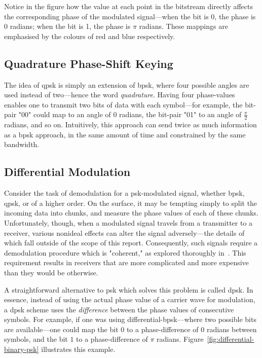 \documentclass[class=report,11pt,crop=false]{standalone}
\begin{document}
Notice in the figure how the value at each point in the bitstream directly affects the corresponding phase of the modulated signal---when the bit is 0, the phase is \(0\) radians; when the bit is 1, the phase is \(\pi\) radians. These mappings are emphasised by the colours of red and blue respectively.

\subsection{Quadrature Phase-Shift Keying}
The idea of \gls{qpsk} is simply an extension of \gls{bpsk}, where four possible angles are used instead of two---hence the word \emph{quadrature}. Having four phase-values enables one to transmit two bits of data with each symbol---for example, the bit-pair "00" could map to an angle of 0 radians, the bit-pair "01" to an angle of \(\frac{\pi}{2}\) radians, and so on. Intuitively, this approach can send twice as much information as a \gls{bpsk} approach, in the same amount of time and constrained by the same bandwidth.

\subsection{Differential Modulation}
Consider the task of demodulation for a \gls{psk}-modulated signal, whether \gls{bpsk}, \gls{qpsk}, or of a higher order. On the surface, it may be tempting simply to split the incoming data into chunks, and measure the phase values of each of these chunks. Unfortunately, though, when a modulated signal travels from a transmitter to a receiver, various nonideal effects can alter the signal adversely---the details of which fall outside of the scope of this report. Consequently, such signals require a demodulation procedure which is "coherent," as explored thoroughly in~\cite{Grami2016}. This requirement results in receivers that are more complicated and more expensive than they would be otherwise.

A straightforward alternative to \gls{psk} which solves this problem is called \gls{dpsk}. In essence, instead of using the actual phase value of a carrier wave for modulation, a \gls{dpsk} scheme uses the \emph{difference} between the phase values of consecutive symbols. For example, if one was using differential-\gls{bpsk}---where two possible bits are available---one could map the bit \(0\) to a phase-difference of \(0\) radians between symbols, and the bit \(1\) to a phase-difference of \(\pi\) radians. Figure~\ref{fig:differential-binary-psk} illustrates this example.
\end{document}
